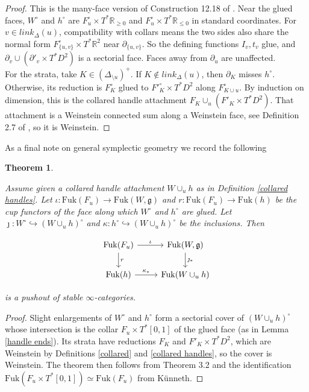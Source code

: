 \documentclass[11pt]{amsart}
\newtheorem{thm}{Theorem}[section]
\theoremstyle{definition}
\theoremstyle{remark}
\newcommand{\Fuk}{\mathrm{Fuk}}
\numberwithin{equation}{section}
\begin{document}
\begin{proof}
This is the many-face version of Construction 12.18 of \cite{GPSI}. Near the glued faces, $W^\circ$ and $h^\circ$ are $F^\circ_u\times T^*\mathbb R_{\ge0}$ and $F^\circ_u\times T^*\mathbb R_{\le0}$ in standard coordinates. For $v \in link_\Delta(u)$, compatibility with collars means the two sides also share the normal form $F^\circ_{\{u,v\}}\times T^*\mathbb R^2$ near $\partial_{\{u,v\}}$. So the defining functions $I_v,t_v$ glue, and $\partial_v\cup(\partial'_v\times T^*D^2)$ is a sectorial face. Faces away from $\partial_u$ are unaffected.\\

For the strata, take $K\in(\Delta_{\setminus u})^+$. If $K\notin link_\Delta(u)$, then $\partial_K$ misses $h^\circ$. Otherwise, its reduction is $F^\circ_K$ glued to $F'^\circ_K\times T^*D^2$ along $F^\circ_{K\cup u}$. By induction on dimension, this is the collared handle attachment $F_K\cup_u(F'_K\times T^*D^2)$. That attachment is a Weinstein connected sum along a Weinstein face, see Definition 2.7 of \cite{Asplund}, so it is Weinstein.
\end{proof}

As a final note on general symplectic geometry we record the following

\begin{thm}\label{thm:handle-pushout}

Assume given a collared handle attachment $W\cup_uh$ as in Definition \ref{collared handles}. Let $\iota\colon \Fuk(F_u)\to \Fuk(W,\mathfrak g)$ and $r\colon \Fuk(F_u)\to \Fuk(h)$ be the cup functors of the face along which $W^\circ$ and $h^\circ$ are glued. Let $\jmath\colon W^\circ\hookrightarrow(W\cup_uh)^\circ$ and $\kappa\colon h^\circ\hookrightarrow(W\cup_uh)^\circ$ be the inclusions. Then

\[\begin{tikzcd}
	\Fuk(F_u) \arrow[r, "\iota"] \arrow[d, "r"] & \Fuk(W, \mathfrak{g}) \arrow[d, "\jmath_*"] \\
	\Fuk(h) \arrow[r, "\kappa_*"]& \Fuk(W \cup_u h)
\end{tikzcd}\]

is a pushout of stable $\infty$-categories.
\end{thm}

\begin{proof}
    Slight enlargements of $W^\circ$ and $h^\circ$ form a sectorial cover of $(W\cup_uh)^\circ$ whose intersection is the collar $F_u\times T^*[0,1]$ of the glued face (as in Lemma \ref{handle ends}). Its strata have reductions $F_K$ and $F'_K\times T^*D^2$, which are Weinstein by Definitions \ref{collared} and \ref{collared handles}, so the cover is Weinstein. The theorem then follows from Theorem 3.2 and the identification $\Fuk(F_u\times T^*[0,1])\simeq \Fuk(F_u)$ from K\"{u}nneth.
\end{proof}
\end{document}
